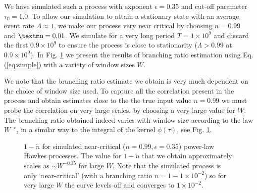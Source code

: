 \documentclass{article}
\begin{document}
We have simulated such a process with exponent $\epsilon = 0.35$ and cut-off
parameter $\tau_0 = 1.0$. To allow our simulation to attain a stationary state
with an average event rate $\Lambda \approx 1$, we make our process very near
critical by choosing $n = 0.99$ and ${\textmu}= 0.01$. We simulate for a very
long period $T = 1 \times 10^9$ and discard the first $0.9 \times 10^9$ to
ensure the process is close to stationarity ($\Lambda > 0.99$ at $0.9 \times
10^9$). In Fig. \ref{fig:power} we present the results of branching ratio
estimation using Eq. (\ref{eq:simple}) with a variety of window sizes $W$.

We note that the branching ratio estimate we obtain is very much dependent on
the choice of window size used. To capture all the correlation present in the
process and obtain estimates close to the the true input value $n = 0.99$ we
must probe the correlation on very large scales, by choosing a very large
value for $W$. The branching ratio obtained indeed varies with window size
according to the law $W^{- \epsilon}$, in a similar way to the integral of the
kernel $\phi (\tau)$, see Fig. \ref{fig:power}.

\begin{figure}[h]
  \caption{\label{fig:power} $1 - \tilde{n}$ for simulated near-critical ($n
  = 0.99, \epsilon = 0.35$) power-law Hawkes processes. The value for $1 -
  \tilde{n}$ that we obtain approximately scales as $\sim W^{- 0.35}$ for
  large $W$. Note that the simulated process is only `near-critical' (with a
  branching ratio $n = 1 - 1 \times 10^{- 2}$) so for very large $W$ the curve
  levels off and converges to $1 \times 10^{- 2}$.}
\end{figure}
\end{document}
